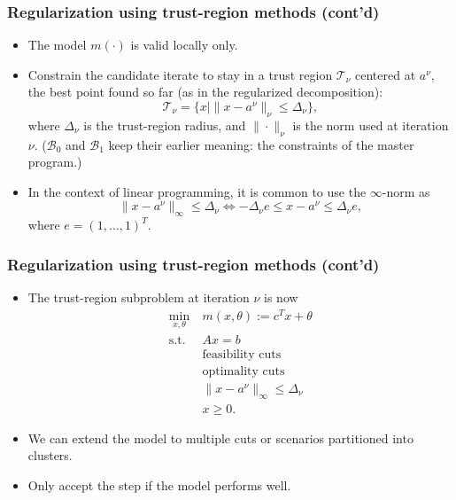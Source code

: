 \documentclass[aspectratio=169]{beamer}
\begin{document}
\begin{frame}
\frametitle{Regularization using trust-region methods (cont'd)}

\begin{itemize}
	\item The model $m(\cdot)$ is valid locally only.
	\item Constrain the candidate iterate to stay in a trust region $\mathcal{T}_{\nu}$ centered at $a^{\nu}$, the best point found so far (as in the regularized decomposition):
$$
\mathcal{T}_{\nu} = \{ x \mid \| x-a^{\nu} \|_{\nu} \leq \Delta_{\nu} \},
$$
where $\Delta_{\nu}$ is the trust-region radius, and $\|\cdot\|_{\nu}$ is the norm used at iteration ${\nu}$.
($\mathcal{B}_0$ and $\mathcal{B}_1$ keep their earlier meaning: the constraints of the master program.)
\item
In the context of linear programming, it is common to use the $\infty$-norm as
$$
\| x-a^{\nu} \|_{\infty} \leq \Delta_{\nu} \iff -\Delta_{\nu} e \leq x-a^{\nu} \leq \Delta_{\nu} e,
$$
where $e = (1,\ldots,1)^T$.
\end{itemize}
\end{frame}

\begin{frame}
\frametitle{Regularization using trust-region methods (cont'd)}

\begin{itemize}
	\item 
The trust-region subproblem at iteration $\nu$ is now
\begin{align*}
	\min_{x,\theta} \ & m(x,\theta) := c^T x + \theta \\
	\text{s.t. } & Ax = b \\
	& \text{feasibility cuts} \\
	& \text{optimality cuts} \\
	& \|x-a^{\nu}\|_{\infty} \leq \Delta_{\nu}\\
	& x \geq 0.
\end{align*}
\item
We can extend the model to multiple cuts or scenarios partitioned into clusters.
\item
Only accept the step if the model performs well.
\end{itemize}

\end{frame}
\end{document}
